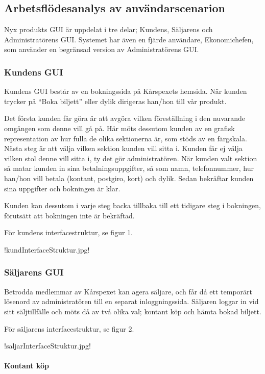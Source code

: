 \documentclass[a4paper, twoside, 11pt, titlepage]{article}
\begin{document}
	\subsection{Arbetsflödesanalys av användarscenarion}


	Nyx produkts GUI är uppdelat i tre delar; Kundens, Säljarens och Administratörens GUI. Systemet har även en fjärde användare, Ekonomichefen, som använder en begränsad version av Administratörens GUI.

		\subsubsection{Kundens GUI}


		Kundens GUI består av en bokningssida på Kårspexets hemsida. När kunden trycker på ``Boka biljett'' eller dylik dirigeras han/hon till vår produkt. 

		Det första kunden får göra är att avgöra vilken föreställning i den nuvarande omgången som denne vill gå på. Här möts dessutom kunden av en grafisk representation av hur fulla de olika sektionerna är, som stöds av en färgskala. Nästa steg är att välja vilken sektion kunden vill sitta i. Kunden får ej välja vilken stol denne vill sitta i, ty det gör administratören. När kunden valt sektion så matar kunden in sina betalningsuppgifter, så som namn, telefonnummer, hur han/hon vill betala (kontant, postgiro, kort) och dylik. Sedan bekräftar kunden sina uppgifter och bokningen är klar.

		Kunden kan dessutom i varje steg backa tillbaka till ett tidigare steg i bokningen, förutsätt att bokningen inte är bekräftad. 

		För kundens interfacestruktur, se figur 1.

		!kundInterfaceStruktur.jpg!

		\subsubsection{Säljarens GUI}


		Betrodda medlemmar av Kårspexet kan agera säljare, och får då ett temporärt lösenord av administratören till en separat inloggningssida. Säljaren loggar in vid sitt säljtillfälle och möts då av två olika val; kontant köp och hämta bokad biljett.

		För säljarens interfacestruktur, se figur 2.

		!saljarInterfaceStruktur.jpg!

			\paragraph{Kontant köp}\
\end{document}
